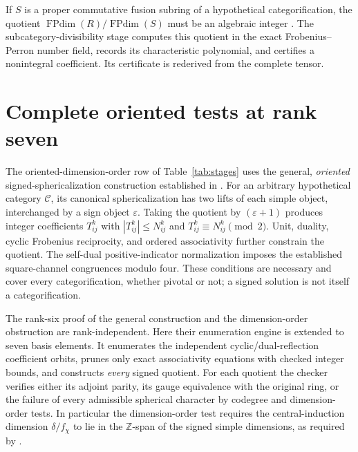 \documentclass[11pt]{article}
\newcommand{\Z}{\mathbb Z}
\newcommand{\FPdim}{\operatorname{FPdim}}
\begin{document}
If $S$ is a proper commutative fusion subring of a hypothetical
categorification, the quotient $\FPdim(R)/\FPdim(S)$ must be an
algebraic integer \cite{ENO}. The subcategory-divisibility stage
computes this quotient in the exact Frobenius--Perron number field,
records its characteristic polynomial, and certifies a nonintegral
coefficient. Its certificate is rederived from the complete tensor.

\section{Complete oriented tests at rank seven}
The oriented-dimension-order row of Table~\ref{tab:stages} uses the general, \emph{oriented}
signed-sphericalization construction established in \cite{Rank6}.
For an arbitrary hypothetical category $\mathcal C$, its canonical
sphericalization has two lifts of each simple object, interchanged
by a sign object $\varepsilon$. Taking the quotient by
$(\varepsilon+1)$ produces integer coefficients $T_{ij}^k$ with
$|T_{ij}^k|\le N_{ij}^k$ and
$T_{ij}^k\equiv N_{ij}^k\pmod 2$.
Unit, duality, cyclic Frobenius reciprocity, and ordered associativity
further constrain the quotient. The self-dual positive-indicator
normalization imposes the established square-channel congruences
modulo four. These conditions are necessary and cover every
categorification, whether pivotal or not; a signed solution is not
itself a categorification.

The rank-six proof of the general construction and the
dimension-order obstruction \cite{Rank6} are rank-independent. Here
their enumeration engine is extended to seven basis elements. It
enumerates the independent cyclic/dual-reflection coefficient orbits,
prunes only exact associativity equations with checked integer bounds,
and constructs \emph{every} signed quotient. For each quotient the
checker verifies either its adjoint parity, its gauge equivalence
with the original ring, or the failure of every admissible spherical
character by codegree and dimension-order tests. In particular the
dimension-order test requires the central-induction dimension
$\delta/f_\chi$ to lie in the $\Z$-span of the signed simple
dimensions, as required by \cite{OstrikRank3,Rank6}.
\end{document}
